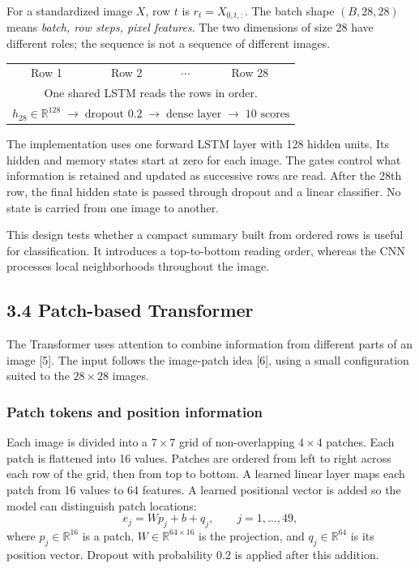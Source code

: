 For a standardized image $X$, row $t$ is
$r_t=X_{0,t,:}$. The batch shape $(B,28,28)$ means
\emph{batch, row steps, pixel features}. The two dimensions of size 28 have
different roles; the sequence is not a sequence of different images.

\begin{center}
\small
\begin{tabular}{c@{\ $\longrightarrow$\ }c@{\ $\longrightarrow$\ }c@{\ $\longrightarrow$\ }c}
Row 1 & Row 2 & $\cdots$ & Row 28\\
\multicolumn{4}{c}{One shared LSTM reads the rows in order.}\\[5pt]
\multicolumn{4}{c}{$h_{28}\in\mathbb{R}^{128}
\;\longrightarrow\; \text{dropout }0.2
\;\longrightarrow\; \text{dense layer}
\;\longrightarrow\; 10\text{ scores}$}
\end{tabular}
\end{center}

The implementation uses one forward LSTM layer with 128 hidden units. Its
hidden and memory states start at zero for each image. The gates control what
information is retained and updated as successive rows are read. After the
28th row, the final hidden state is passed through dropout and a linear
classifier. No state is carried from one image to another.

This design tests whether a compact summary built from ordered rows is useful
for classification. It introduces a top-to-bottom reading order, whereas the
CNN processes local neighborhoods throughout the image.


\subsection{3.4 Patch-based Transformer}
The Transformer uses attention to combine information from different parts of
an image [5]. The input follows the image-patch idea
[6], using a small configuration suited to the $28\times28$ images.

\subsubsection{Patch tokens and position information}
Each image is divided into a $7\times7$ grid of non-overlapping $4\times4$
patches. Each patch is flattened into 16 values. Patches are ordered from left
to right across each row of the grid, then from top to bottom.
A learned linear layer maps each patch from 16 values to 64 features.
A learned positional vector is added so the model can distinguish patch
locations:
\[
e_j=Wp_j+b+q_j,\qquad j=1,\ldots,49,
\]
where $p_j\in\mathbb{R}^{16}$ is a patch,
$W\in\mathbb{R}^{64\times16}$ is the projection, and
$q_j\in\mathbb{R}^{64}$ is its position vector.
Dropout with probability 0.2 is applied after this addition.

